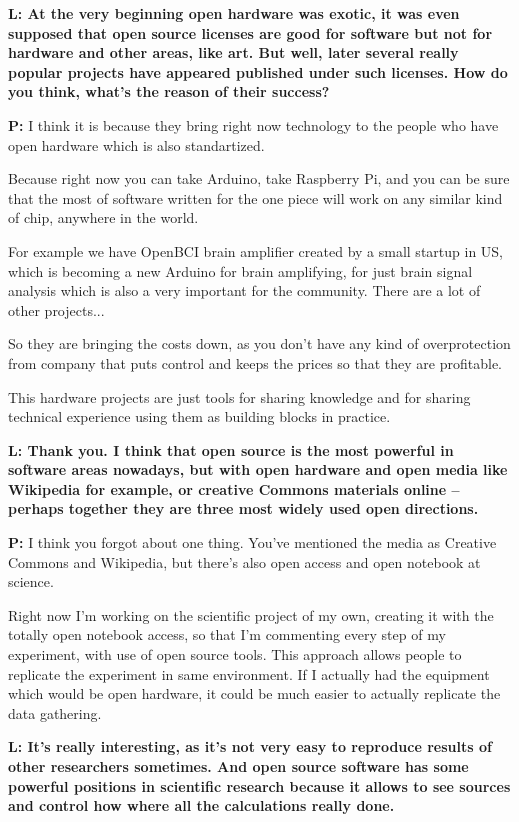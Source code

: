 \documentclass[10pt, a5paper]{article}
\begin{document}
\begin{Parallel}[p]{}{}
{{\noindent \bf L: At the very beginning open hardware was exotic, it was even supposed that open source licenses are good for software but not for hardware and other areas, like art. But well, later several really popular projects have appeared published under such licenses. How do you think, what's the reason of their success?}

{\noindent \bf P:} I think it is because they bring right now technology to the people who have open hardware which is also standartized.

Because right now you can take Arduino, take Raspberry Pi, and you can be sure that the most of software written for the one piece will work on any similar kind of chip, anywhere in the world. 

For example we have OpenBCI brain amplifier created by a small startup in US, which is becoming a new Arduino for brain amplifying, for just brain signal analysis which is also a very important for the community. There are a lot of other projects...

So they are bringing the costs down, as you don't have any kind of overprotection from company that puts control and keeps the prices  so that they are profitable. 

This hardware projects are just tools for sharing knowledge and for sharing technical experience using them as building blocks in practice.

{\noindent \bf L: Thank you. 
I think that open source is the most powerful in software areas nowadays, but with open hardware and open media like Wikipedia for example, or creative Commons materials online – perhaps together they are three most widely used open directions.}

{\noindent \bf P:} I think you forgot about one thing. You’ve mentioned the media as Creative Commons and Wikipedia, but there's also open access and open notebook at science. 

Right now I’m working on the scientific project of my own, creating it with the totally open notebook access, so that I’m commenting every step of my experiment, with use of open source tools. This approach allows people to replicate the experiment in same environment. If I actually had the equipment which would be open hardware, it could be much easier to actually replicate the data gathering.

{\noindent \bf L: It’s really interesting, as it’s not very easy to reproduce results of other researchers sometimes.
And open source software has some powerful positions in scientific research because it allows to see sources and control how where all the calculations really done. }

}
\end{Parallel}
\end{document}
